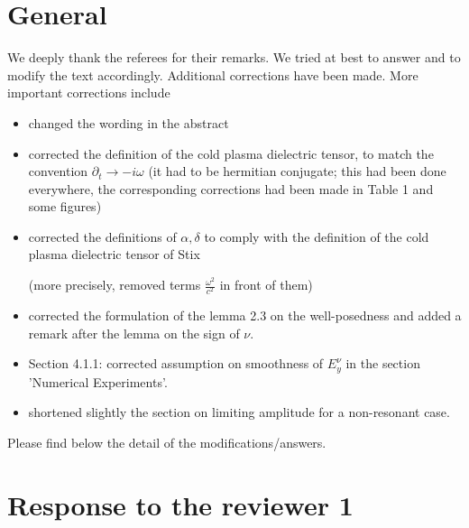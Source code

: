 \documentclass[a4paper,10pt]{article}
\title{}
\author{}
\begin{document}
\maketitle

\begin{abstract}

\end{abstract}

\section{General}

We deeply thank the referees for their remarks. We tried at best to answer and to modify the text accordingly.
Additional corrections have been made.
 More important corrections include
\begin{itemize}
\item changed the wording in the abstract

\item corrected the definition of the cold plasma dielectric tensor, to match the convention $\partial_t\rightarrow -i\omega$ (it had to be hermitian conjugate; 
this had been done everywhere, the corresponding corrections had been made in Table 1 and some figures)

\item corrected the definitions of $\alpha,\delta$ to comply with the definition of the cold plasma dielectric tensor of Stix 

(more precisely, removed terms $\frac{\omega^2}{c^2}$ in 
front of them)

\item corrected the formulation of the lemma 2.3 on the well-posedness and added a remark after the lemma on the sign of $\nu$.

\item Section 4.1.1: corrected assumption on smoothness of $E_y^{\nu}$ in the section 'Numerical Experiments'.

\item shortened slightly the section on limiting amplitude for a non-resonant case.
\end{itemize}

Please find below the detail of the modifications/answers.

\section{Response to the reviewer 1}
\end{document}
